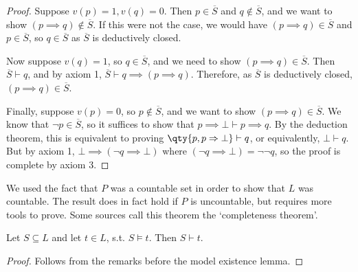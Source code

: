 \begin{proof}
    Suppose $v(p) = 1, v(q) = 0$.
    Then $p \in \overline S$ and $q \not\in \overline S$, and we want to show $(p \implies q) \not\in \overline S$.
    If this were not the case, we would have $(p \implies q) \in \overline S$ and $p \in \overline S$, so $q \in \overline S$ as $\overline S$ is deductively closed.

    Now suppose $v(q) = 1$, so $q \in \overline S$, and we need to show $(p \implies q) \in \overline S$.
    Then $\overline S \vdash q$, and by axiom 1, $\overline S \vdash q \implies (p \implies q)$.
    Therefore, as $\overline S$ is deductively closed, $(p \implies q) \in \overline S$.

    Finally, suppose $v(p) = 0$, so $p \not\in \overline S$, and we want to show $(p \implies q) \in \overline S$.
    We know that $\neg p \in \overline S$, so it suffices to show that $p \implies \bot \vdash p \implies q$.
    By the deduction theorem, this is equivalent to proving $\qty{p, p \implies \bot} \vdash q$, or equivalently, $\bot \vdash q$.
    But by axiom 1, $\bot \implies (\neg q \implies \bot)$ where $(\neg q \implies \bot) = \neg\neg q$, so the proof is complete by axiom 3.
\end{proof}
\begin{remark}
    We used the fact that $P$ was a countable set in order to show that $L$ was countable.
    The result does in fact hold if $P$ is uncountable, but requires more tools to prove.
    Some sources call this theorem the `completeness theorem'.
\end{remark}
\begin{corollary}[adequacy]
    Let $S \subseteq L$ and let $t \in L$, s.t. $S \models t$.
    Then $S \vdash t$.
\end{corollary}
\begin{proof}
    Follows from the remarks before the model existence lemma.
\end{proof}

